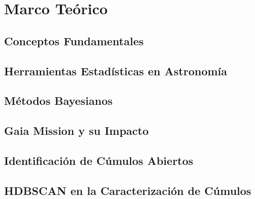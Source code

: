\documentclass[../Main.tex]{subfiles}
\begin{document}
\section{Marco Teórico}

\subsection{Conceptos Fundamentales}
\lipsum[1] %

\subsection{Herramientas Estadísticas en Astronomía}
\lipsum[2] %

\subsection{Métodos Bayesianos}
\lipsum[3] %

\subsection{Gaia Mission y su Impacto}
\lipsum[4] %

\subsection{Identificación de Cúmulos Abiertos}
\lipsum[5] %

\subsection{HDBSCAN en la Caracterización de Cúmulos}
\lipsum[6] %

\biblio
\end{document}
